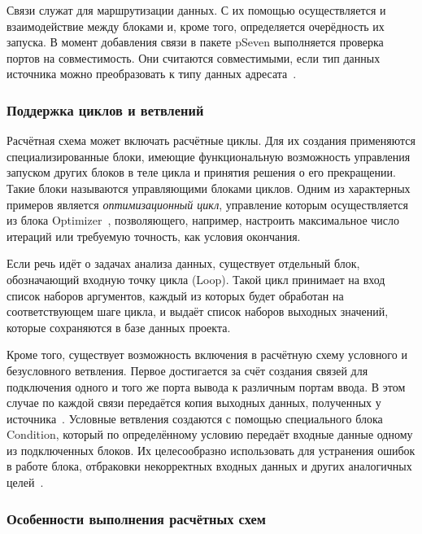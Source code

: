Связи служат для маршрутизации данных. С их помощью осуществляется и взаимодействие между блоками и, кроме того, определяется очерёдность их запуска. В момент добавления связи в пакете \textsf{pSeven} выполняется проверка портов на совместимость. Они считаются совместимыми, если тип данных источника можно преобразовать к типу данных адресата~\cite{pSevenDocsWorkflow2021}.

\subsubsection{Поддержка циклов и ветвлений}

Расчётная схема может включать расчётные циклы. Для их создания применяются специализированные блоки, имеющие функциональную возможность управления запуском других блоков в теле цикла и принятия решения о его прекращении. Такие блоки называются управляющими блоками циклов. Одним из характерных примеров является \textit{оптимизационный цикл}, управление которым осуществляется из блока \textsf{Optimizer}~\cite{pSevenDocsWorkflow2021}, позволяющего, например, настроить максимальное число итераций или требуемую точность, как условия окончания.

Если речь идёт о задачах анализа данных, существует отдельный блок, обозначающий входную точку цикла (\textsf{Loop}). Такой цикл принимает на вход список наборов аргументов, каждый из которых будет обработан на соответствующем шаге цикла, и выдаёт список наборов выходных значений, которые сохраняются в базе данных проекта.

Кроме того, существует возможность включения в расчётную схему условного и безусловного ветвления. Первое достигается за счёт создания связей для подключения одного и того же порта вывода к различным портам ввода. В этом случае по каждой связи передаётся копия выходных данных, полученных у источника~\cite{pSevenDocsWorkflow2021}. Условные ветвления создаются с помощью специального блока \textsf{Condition}, который по определённому условию передаёт входные данные одному из подключенных блоков. Их целесообразно использовать для устранения ошибок в работе блока, отбраковки некорректных входных данных и других аналогичных целей~\cite{pSevenDocsWorkflow2021}.

\subsubsection{Особенности выполнения расчётных схем}


